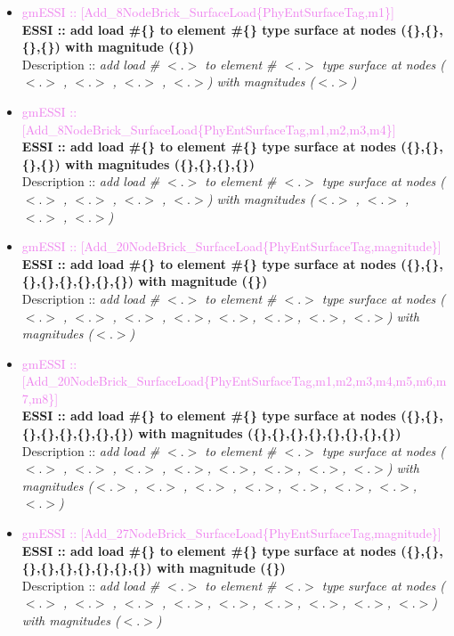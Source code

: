 \documentclass[11pt]{article}
\begin{document}
  \begin{itemize}
  
    \item \textcolor{violet} {gmESSI :: [Add\_8NodeBrick\_SurfaceLoad\{PhyEntSurfaceTag,m1\}]}\\                      
    \textbf{ESSI :: add load \#\{\} to element \#\{\} type surface at nodes (\{\},\{\},\{\},\{\}) with magnitude (\{\})}\\
    Description :: \textit{add load \# $<.>$ to element \# $<.>$ type surface at nodes ($<.>$ , $<.>$ , $<.>$ , $<.>$) with magnitudes ($<.>$)}

    \item \textcolor{violet} {gmESSI :: [Add\_8NodeBrick\_SurfaceLoad\{PhyEntSurfaceTag,m1,m2,m3,m4\}]}\\                         
    \textbf{ESSI :: add load \#\{\} to element \#\{\} type surface at nodes (\{\},\{\},\{\},\{\}) with magnitudes (\{\},\{\},\{\},\{\})}\\
    Description :: \textit{add load \# $<.>$ to element \# $<.>$ type surface at nodes ($<.>$ , $<.>$ , $<.>$ , $<.>$) with magnitudes ($<.>$ , $<.>$ , $<.>$ , $<.>$)}

    \item \textcolor{violet} {gmESSI :: [Add\_20NodeBrick\_SurfaceLoad\{PhyEntSurfaceTag,magnitude\}]}\\              
    \textbf{ESSI :: add load \#\{\} to element \#\{\} type surface at nodes (\{\},\{\},\{\},\{\},\{\},\{\},\{\},\{\}) with magnitude (\{\})}\\
    Description :: \textit{add load \# $<.>$ to element \# $<.>$ type surface at nodes ($<.>$ , $<.>$ , $<.>$ , $<.>$, $<.>$, $<.>$, $<.>$, $<.>$) with magnitudes ($<.>$)}

    \item \textcolor{violet} {gmESSI :: [Add\_20NodeBrick\_SurfaceLoad\{PhyEntSurfaceTag,m1,m2,m3,m4,m5,m6,m7,m8\}]}\\
    \textbf{ESSI :: add load \#\{\} to element \#\{\} type surface at nodes (\{\},\{\},\{\},\{\},\{\},\{\},\{\},\{\}) with magnitudes (\{\},\{\},\{\},\{\},\{\},\{\},\{\},\{\})}\\
    Description :: \textit{add load \# $<.>$ to element \# $<.>$ type surface at nodes ($<.>$ , $<.>$ , $<.>$ , $<.>$, $<.>$, $<.>$, $<.>$, $<.>$) with magnitudes ($<.>$ , $<.>$ , $<.>$ , $<.>$, $<.>$, $<.>$, $<.>$, $<.>$)}

    \item \textcolor{violet} {gmESSI :: [Add\_27NodeBrick\_SurfaceLoad\{PhyEntSurfaceTag,magnitude\}]}\\             
    \textbf{ESSI :: add load \#\{\} to element \#\{\} type surface at nodes (\{\},\{\},\{\},\{\},\{\},\{\},\{\},\{\},\{\}) with magnitude (\{\})}\\
    Description :: \textit{add load \# $<.>$ to element \# $<.>$ type surface at nodes ($<.>$ , $<.>$ , $<.>$ , $<.>$, $<.>$, $<.>$, $<.>$, $<.>$, $<.>$) with magnitudes ($<.>$)}


\end{itemize}
\end{document}
